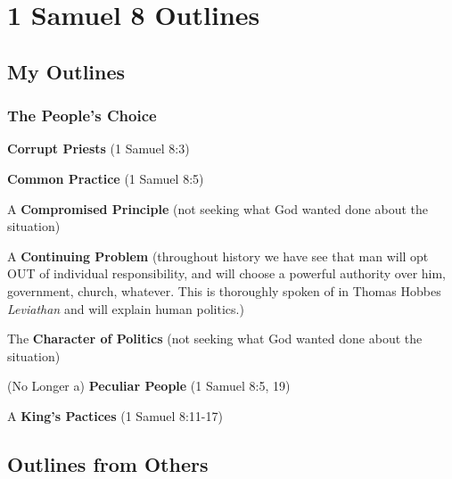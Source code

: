 \section{1 Samuel 8 Outlines}


\subsection{My Outlines}

\subsubsection{The People's Choice}
\begin{compactenum}[I.]
    \item \textbf{Corrupt Priests} (1 Samuel 8:3) 
    \item \textbf{Common Practice} (1 Samuel 8:5) 
    \item A \textbf{Compromised Principle} (not seeking what God wanted done about the situation)%
    \item A \textbf{Continuing Problem} (throughout history we have see that man will opt OUT of individual responsibility, and will choose a powerful authority over him, government, church, whatever. This is thoroughly spoken of in Thomas Hobbes \emph{Leviathan} and will explain human politics.)%
    \item The \textbf{Character of Politics} (not seeking what God wanted done about the situation)%
    \item (No Longer a) \textbf{Peculiar People} (1 Samuel 8:5, 19) 
    \item A \textbf{King's Pactices} (1 Samuel 8:11-17) 
\end{compactenum}

\subsection{Outlines from Others}

